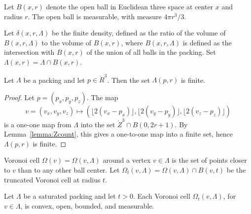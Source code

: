 



  Let $B(x,r)$ denote the open ball in
Euclidean three space at center $x$ and radius $r$.  The open ball
is measurable, with measure $4\pi r^3/3$.



Let $\delta(x,r,\Lambda)$ be the finite density, defined as the
ratio of the volume of $B(x,r,\Lambda)$ to the volume of $B(x,r)$,
where $B(x,r,\Lambda)$ is defined as the intersection with
$B(x,r)$ of the union of all balls in the packing. Set
$\Lambda(x,r) = \Lambda \cap
B(x,r)$.

\begin{lemma}\label{lemma:Lambda-finite}
Let $\Lambda$ be a packing and let $p\in\ring{R}^3$.
Then the set $\Lambda(p,r)$ is finite.
\end{lemma}

\begin{proof}  Let $p = (p_x,p_y,p_z)$. The map
$$v=(v_x,v_y,v_z)\mapsto (\lfloor 2(v_x-p_x)
\rfloor, \lfloor 2(v_y-p_y) \rfloor, \lfloor 2(v_z-p_z) \rfloor)$$
is a one-one map from $\Lambda$ into the set $\ring{Z}^3\cap B(0,2
r
 + 1)$.  By Lemma~\ref{lemma:Zcount}, this gives a one-to-one map
 into a finite set, hence $\Lambda(p,r)$ is finite.
\end{proof}

\begin{definition}\label{def:voronoi} Voronoi cell
$\Omega(v)=\Omega(v,\Lambda)$ around a
vertex $v\in \Lambda$ is the set of points closer to $v$ than to
any other ball center.  Let $\Omega_t(v,\Lambda) = \Omega(v,\Lambda)
\cap B(v,t)$ be the truncated Voronoi cell at radius $t$.
\end{definition}

\begin{lemma} Let $\Lambda$ be a saturated packing and let $t>0$.
Each Voronoi cell $\Omega_t(v,\Lambda)$, for $v\in\Lambda$, is
convex, open, bounded, and measurable.
\end{lemma}

